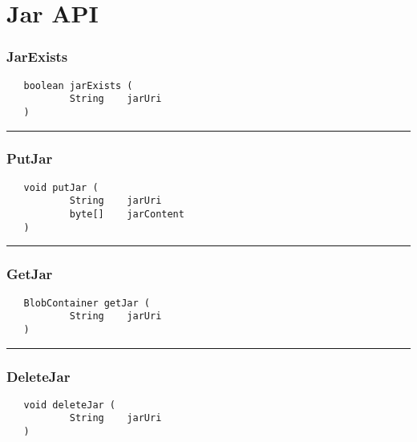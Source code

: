 \chapter{Jar API}

\subsection{JarExists}
\label{Api:JarExists}
\begin{verbatim}
   boolean jarExists (
           String    jarUri
   )
\end{verbatim}



\rule{15cm}{2pt}
\subsection{PutJar}
\label{Api:PutJar}
\begin{verbatim}
   void putJar (
           String    jarUri
           byte[]    jarContent
   )
\end{verbatim}



\rule{15cm}{2pt}
\subsection{GetJar}
\label{Api:GetJar}
\begin{verbatim}
   BlobContainer getJar (
           String    jarUri
   )
\end{verbatim}



\rule{15cm}{2pt}
\subsection{DeleteJar}
\label{Api:DeleteJar}
\begin{verbatim}
   void deleteJar (
           String    jarUri
   )
\end{verbatim}



